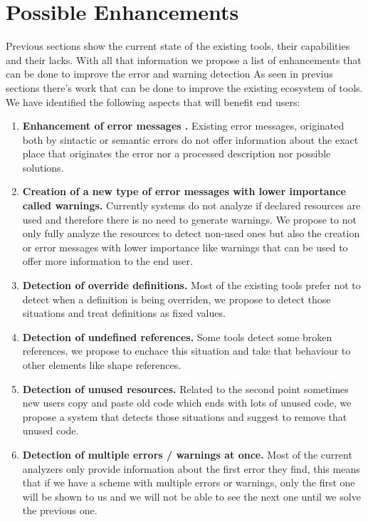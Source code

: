 \section{Possible Enhancements}\label{sec:anal-enhacements}
Previous sections show the current state of the existing tools, their capabilities and their lacks.
With all that information we propose a list of enhancements that can be done to improve the error and warning detection
As seen in previus sections there's work that can be done to improve the existing ecosystem of tools. We have identified the following aspects
that will benefit end users:

\begin{enumerate}
    \item \textbf{Enhancement of error messages \cite{heeren2005top}.} Existing error messages, originated both by sintactic or semantic errors do not offer information about
    the exact place that originates the error nor a processed description nor possible solutions.

    \item \textbf{Creation of a new type of error messages with lower importance called warnings.} Currently systems do not analyze if declared resources are
    used and therefore there is no need to generate warnings. We propose to not only fully analyze the resources to detect non-used ones but also the creation
    or error messages with lower importance like warnings that can be used to offer more information to the end user.

    \item \textbf{Detection of override definitions.} Most of the existing tools prefer not to detect when a definition is being overriden, we propose to detect those
    situations and treat definitions as fixed values.

    \item \textbf{Detection of undefined references.} Some tools detect some broken references, we propose to enchace this situation and take that behaviour to
    other elements like shape references.

    \item \textbf{Detection of unused resources.} Related to the second point sometimes new users copy and paste old code which ends with lots of unused code,
    we propose a system that detects those situations and suggest to remove that unused code.

    \item \textbf{Detection of multiple errors / warnings at once.} Most of the current analyzers only provide information about the first error they find,
    this means that if we have a scheme with multiple errors or warnings, only the first one will be shown to us and we will not be able to see the next one
    until we solve the previous one. 
\end{enumerate}